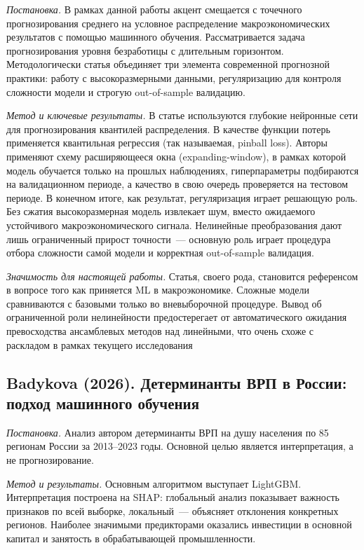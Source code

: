 \documentclass[12pt,a4paper]{article}
\begin{document}
\textit{Постановка.} В рамках данной работы акцент смещается с точечного
прогнозирования среднего на условное распределение макроэкономических
результатов с помощью машинного обучения. Рассматривается задача
прогнозирования уровня безработицы с длительным горизонтом. Методологически
статья объединяет три элемента современной прогнозной практики: работу с
высокоразмерными данными, регуляризацию для контроля сложности модели и
строгую out-of-sample валидацию.

\textit{Метод и ключевые результаты.} В статье используются глубокие
нейронные сети для прогнозирования квантилей распределения. В качестве
функции потерь применяется квантильная регрессия (так называемая, pinball loss). Авторы
применяют схему расширяющееся окна (expanding-window), в рамках которой модель обучается только на прошлых
наблюдениях, гиперпараметры подбираются на валидационном периоде, а качество в свою очередь
проверяется на тестовом периоде. В конечном итоге, как результат, регуляризация играет
решающую роль. Без сжатия высокоразмерная модель извлекает шум, вместо ожидаемого
устойчивого макроэкономического сигнала. Нелинейные преобразования дают лишь
ограниченный прирост точности~--- основную роль играет
процедура отбора сложности самой модели и корректная out-of-sample валидация.

\textit{Значимость для настоящей работы.} Статья, своего рода, становится референсом в вопросе того как приняется ML в макроэкономике. Сложные модели сравниваются
с базовыми только во вневыборочной процедуре. Вывод об ограниченной роли
нелинейности предостерегает от автоматического ожидания превосходства
ансамблевых методов над линейными, что очень схоже с раскладом в рамках текущего исследования

\subsection{Badykova (2026). Детерминанты ВРП в России:
подход машинного обучения~\cite{badykova2026}}

\textit{Постановка.} Анализ автором детерминанты ВРП на душу населения
по 85 регионам России за 2013--2023 годы. Основной целью является интерпретация, а не  прогнозирование.

\textit{Метод и результаты.} Основным алгоритмом выступает LightGBM.
Интерпретация построена на SHAP: глобальный анализ показывает важность
признаков по всей выборке, локальный~--- объясняет отклонения конкретных
регионов. Наиболее значимыми предикторами оказались инвестиции в основной
капитал и занятость в обрабатывающей промышленности.
\end{document}

